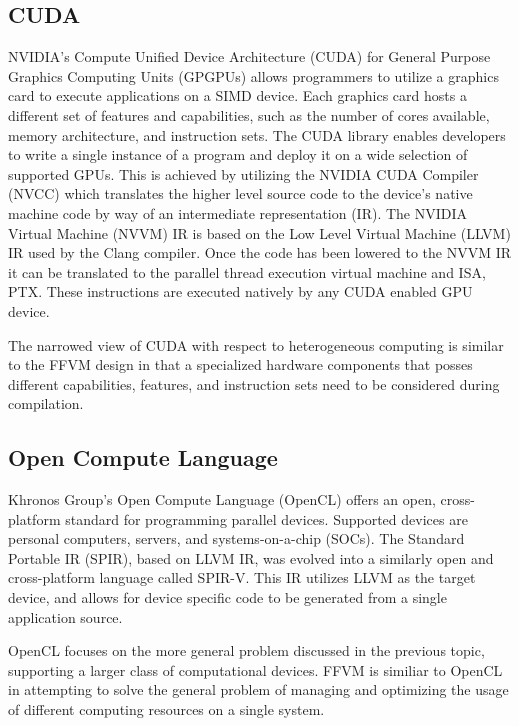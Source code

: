 \subsection{CUDA}
\label{related:cuda}
NVIDIA's Compute Unified Device Architecture (CUDA) \cite{cuda} for General
Purpose Graphics Computing Units (GPGPUs) allows programmers to utilize a
graphics card to execute applications on a SIMD device. Each graphics card
hosts a different set of features and capabilities, such as the number of cores
available, memory architecture, and instruction sets. The CUDA library
enables developers to write a single instance of a program and deploy
it on a wide selection of supported GPUs. This is achieved by utilizing the
NVIDIA CUDA Compiler (NVCC) which translates the higher level source code
to the device's native machine code by way of an intermediate representation
(IR). The NVIDIA Virtual Machine (NVVM) IR is based on the Low Level Virtual
Machine (LLVM) IR used by the Clang compiler. Once the code has been lowered
to the NVVM IR it can be translated to the parallel thread execution virtual
machine and ISA, PTX. These instructions are executed natively by any CUDA
enabled GPU device. 

The narrowed view of CUDA with respect to heterogeneous computing is similar to the FFVM design in that a specialized hardware components that posses different capabilities, features, and instruction sets need to be considered during compilation.

\subsection{Open Compute Language}
\label{related:ocl}
Khronos Group's Open Compute Language (OpenCL) \cite{opencl} offers an open,
cross-platform standard for programming parallel devices. Supported devices are
personal computers, servers, and systems-on-a-chip (SOCs). The Standard
Portable IR (SPIR), based on LLVM IR, was evolved into a similarly open and
cross-platform language called SPIR-V. This IR utilizes LLVM as the target
device, and allows for device specific code to be generated from a single
application source. 

OpenCL focuses on the more general problem discussed in
the previous topic, supporting a larger class of computational devices. FFVM is similiar to OpenCL in attempting to solve the general problem of managing and optimizing the usage of different computing resources on a single system.

